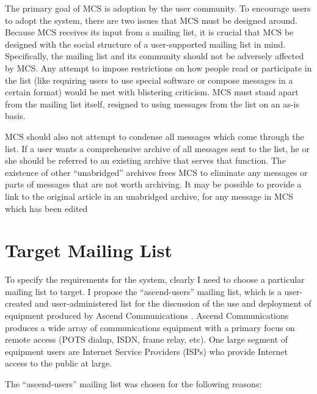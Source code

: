 The primary goal of MCS is adoption by the user community. To encourage users
to adopt the system, there are two issues that MCS must be designed around.
Because MCS receives its input from a mailing list, it is crucial that MCS be
designed with the social structure of a user-supported mailing list in mind.
Specifically, the mailing list and its community should not be adversely
affected by MCS. Any attempt to impose restrictions on how people read or
participate in the list (like requiring users to use special software or
compose messages in a certain format) would be met with blistering criticism.
MCS must stand apart from the mailing list itself, resigned to using messages
from the list on an as-is basis.

MCS should also not attempt to condense all messages which come through the
list. If a user wants a comprehensive archive of all messages sent to the list,
he or she should be referred to an existing archive that serves that function.
The existence of other ``unabridged'' archives frees MCS to eliminate any
messages or parts of messages that are not worth archiving. It may be possible
to provide a link to the original article in an unabridged archive, for any
message in MCS which has been edited

\section{Target Mailing List}
To specify the requirements for the system, clearly I need to choose a
particular mailing list to target. I propose the ``ascend-users'' mailing
list, which is a user-created and user-administered list for the discussion of
the use and deployment of equipment produced by Ascend Communications
\cite{ascend-website}. Ascend Communications produces a wide array of
communications equipment with a primary focus on remote access (POTS dialup,
ISDN, frame relay, etc). One large segment of equipment users are Internet
Service Providers (ISPs) who provide Internet access to the public at large.

The ``ascend-users'' mailing list was chosen for the following reasons:

